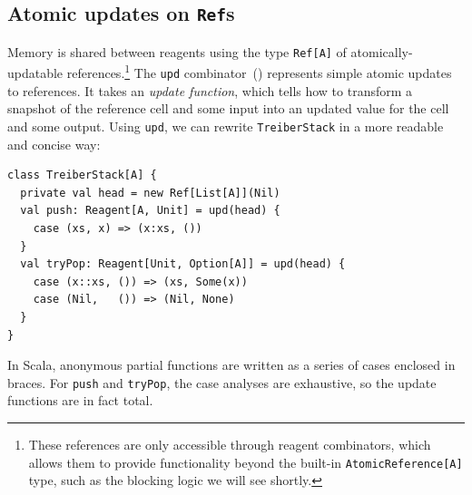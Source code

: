 \documentclass[preprint]{sigplanconf}
\begin{document}


\subsection{Atomic updates on \lstinline{Ref}s}

Memory is shared between reagents using the type \lstinline{Ref[A]} of
atomically-updatable references.\footnote{ These references are only
  accessible through reagent combinators, which allows them to provide
  functionality beyond the built-in \lstinline{AtomicReference[A]} type, such
  as the blocking logic we will see shortly.  }
The \lstinline{upd} combinator~() represents simple atomic
updates to references.  It takes an \emph{update function}, which tells how to
transform a snapshot of the reference cell and some input into an updated
value for the cell and some output.  Using \lstinline{upd}, we can rewrite
\lstinline{TreiberStack} in a more readable and concise way:
\begin{lstlisting}
class TreiberStack[A] {
  private val head = new Ref[List[A]](Nil)
  val push: Reagent[A, Unit] = upd(head) {
    case (xs, x) => (x:xs, ())
  }
  val tryPop: Reagent[Unit, Option[A]] = upd(head) {
    case (x::xs, ()) => (xs, Some(x))
    case (Nil,   ()) => (Nil, None)
  }
}
\end{lstlisting}
In Scala, anonymous partial functions are written as a series of cases
enclosed in braces.  For \lstinline{push} and \lstinline{tryPop}, the case
analyses are exhaustive, so the update functions are in fact total.
\end{document}
